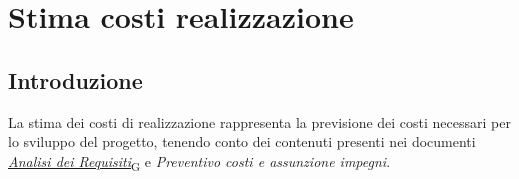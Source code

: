 
\section{Stima costi realizzazione}
\subsection{Introduzione}
La stima dei costi di realizzazione rappresenta la previsione dei costi necessari per lo sviluppo del progetto, tenendo conto dei contenuti presenti nei documenti \href{https://7last.github.io/docs/rtb/documentazione-interna/glossario\#analisi-dei-requisiti}{\textit{Analisi dei Requisiti}\textsubscript{G}} e \textit{Preventivo costi e assunzione impegni}.
